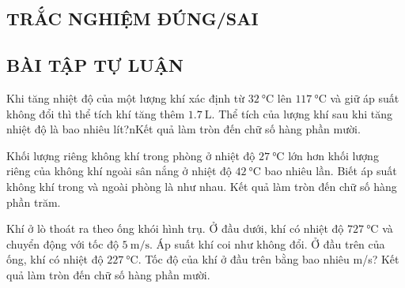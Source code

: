 \subsection{TRẮC NGHIỆM ĐÚNG/SAI}
\setcounter{ex}{0}

\subsection{BÀI TẬP TỰ LUẬN}
\setcounter{ex}{0}
\begin{ex}
	Khi tăng nhiệt độ của một lượng khí xác định từ $\SI{32}{\celsius}$ lên $\SI{117}{\celsius}$ và giữ áp suất không đổi thì thể tích khí tăng thêm $\SI{1.7}{\liter}$. Thể tích của lượng khí sau khi tăng nhiệt độ là bao nhiêu lít?nKết quả làm tròn đến chữ số hàng phần mười.
\end{ex}
\begin{ex}
	Khối lượng riêng không khí trong phòng ở nhiệt độ $\SI{27}{\celsius}$ lớn hơn khối lượng riêng của không khí ngoài sân nắng ở nhiệt độ $\SI{42}{\celsius}$ bao nhiêu lần. Biết áp suất không khí trong và ngoài phòng là như nhau. Kết quả làm tròn đến chữ số hàng phần trăm.
\end{ex}
\begin{ex}
	Khí ở lò thoát ra theo ống khói hình trụ. Ở đầu dưới, khí có nhiệt độ $\SI{727}{\celsius}$ và chuyển động với tốc độ $\SI{5}{\meter/\second}$. Áp suất khí coi như không đổi. Ở đầu trên của ống, khí có nhiệt độ $\SI{227}{\celsius}$. Tốc độ của khí ở đầu trên bằng bao nhiêu \si{\meter/\second}? Kết quả làm tròn đến chữ số hàng phần mười.
\end{ex}
	
	
